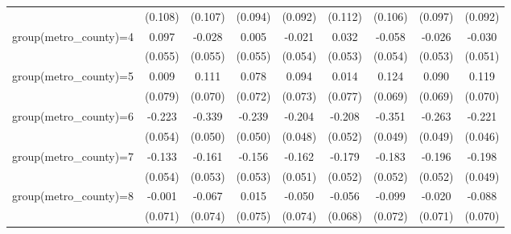 {\begin{tabular}{l*{8}{c}}
                    &     (0.108)         &     (0.107)         &     (0.094)         &     (0.092)         &     (0.112)         &     (0.106)         &     (0.097)         &     (0.092)         \\
group(metro\_county)=4&       0.097\sym{*}  &      -0.028         &       0.005         &      -0.021         &       0.032         &      -0.058         &      -0.026         &      -0.030         \\
                    &     (0.055)         &     (0.055)         &     (0.055)         &     (0.054)         &     (0.053)         &     (0.054)         &     (0.053)         &     (0.051)         \\
group(metro\_county)=5&       0.009         &       0.111         &       0.078         &       0.094         &       0.014         &       0.124\sym{*}  &       0.090         &       0.119\sym{*}  \\
                    &     (0.079)         &     (0.070)         &     (0.072)         &     (0.073)         &     (0.077)         &     (0.069)         &     (0.069)         &     (0.070)         \\
group(metro\_county)=6&      -0.223\sym{***}&      -0.339\sym{***}&      -0.239\sym{***}&      -0.204\sym{***}&      -0.208\sym{***}&      -0.351\sym{***}&      -0.263\sym{***}&      -0.221\sym{***}\\
                    &     (0.054)         &     (0.050)         &     (0.050)         &     (0.048)         &     (0.052)         &     (0.049)         &     (0.049)         &     (0.046)         \\
group(metro\_county)=7&      -0.133\sym{**} &      -0.161\sym{***}&      -0.156\sym{***}&      -0.162\sym{***}&      -0.179\sym{***}&      -0.183\sym{***}&      -0.196\sym{***}&      -0.198\sym{***}\\
                    &     (0.054)         &     (0.053)         &     (0.053)         &     (0.051)         &     (0.052)         &     (0.052)         &     (0.052)         &     (0.049)         \\
group(metro\_county)=8&      -0.001         &      -0.067         &       0.015         &      -0.050         &      -0.056         &      -0.099         &      -0.020         &      -0.088         \\
                    &     (0.071)         &     (0.074)         &     (0.075)         &     (0.074)         &     (0.068)         &     (0.072)         &     (0.071)         &     (0.070)         \\

\end{tabular}}
